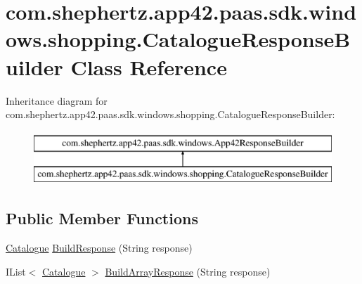 \hypertarget{classcom_1_1shephertz_1_1app42_1_1paas_1_1sdk_1_1windows_1_1shopping_1_1_catalogue_response_builder}{\section{com.\+shephertz.\+app42.\+paas.\+sdk.\+windows.\+shopping.\+Catalogue\+Response\+Builder Class Reference}
\label{classcom_1_1shephertz_1_1app42_1_1paas_1_1sdk_1_1windows_1_1shopping_1_1_catalogue_response_builder}
}
Inheritance diagram for com.\+shephertz.\+app42.\+paas.\+sdk.\+windows.\+shopping.\+Catalogue\+Response\+Builder\+:\begin{figure}[H]
\begin{center}
\leavevmode
\includegraphics[height=2.000000cm]{classcom_1_1shephertz_1_1app42_1_1paas_1_1sdk_1_1windows_1_1shopping_1_1_catalogue_response_builder}
\end{center}
\end{figure}
\subsection*{Public Member Functions}
\begin{DoxyCompactItemize}
\item 
\hyperlink{classcom_1_1shephertz_1_1app42_1_1paas_1_1sdk_1_1windows_1_1shopping_1_1_catalogue}{Catalogue} \hyperlink{classcom_1_1shephertz_1_1app42_1_1paas_1_1sdk_1_1windows_1_1shopping_1_1_catalogue_response_builder_a1ef23b0c07b0d36032b5ea8df3df7513}{Build\+Response} (String response)
\item 
I\+List$<$ \hyperlink{classcom_1_1shephertz_1_1app42_1_1paas_1_1sdk_1_1windows_1_1shopping_1_1_catalogue}{Catalogue} $>$ \hyperlink{classcom_1_1shephertz_1_1app42_1_1paas_1_1sdk_1_1windows_1_1shopping_1_1_catalogue_response_builder_a455cc7a0acef5fc6abd798ab74907344}{Build\+Array\+Response} (String response)
\end{DoxyCompactItemize}



